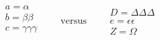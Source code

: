 \documentclass[11pt]{article}
\begin{document}
\begin{equation} \label{eq:gathered}
\begin{gathered}
a = \alpha \\
b = \beta\beta \\
c = \gamma\gamma\gamma \\
\end{gathered} 
\qquad \text{versus} \qquad
\begin{gathered}
D = \Delta\Delta\Delta \\
e = \epsilon\epsilon \\
Z = \Omega
\end{gathered} 
\end{equation}
\end{document}
